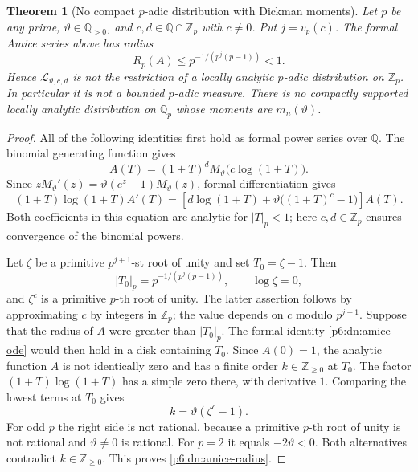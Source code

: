 \documentclass[11pt,a4paper]{article}
\newtheorem{theorem}{Theorem}[section]
\theoremstyle{definition}
\theoremstyle{remark}
\numberwithin{equation}{section}
\begin{document}
\begin{theorem}[No compact $p$-adic distribution with Dickman moments]
\label{p6:dn:no-transfer}
Let $p$ be any prime, $\vartheta\in\mathbb Q_{>0}$,
and $c,d\in\mathbb Q\cap\mathbb Z_p$ with $c\ne0$.
Put $j=v_p(c)$.  The formal Amice series above has radius
\begin{equation}\label{p6:dn:amice-radius}
 R_p(A)\le p^{-1/(p^j(p-1))}<1.
\end{equation}
Hence $\mathcal L_{\vartheta,c,d}$ is not the restriction of a
locally analytic $p$-adic distribution on $\mathbb Z_p$.
In particular it is not a bounded $p$-adic measure.
There is no compactly supported locally analytic distribution on
$\mathbb Q_p$ whose moments are $m_n(\vartheta)$.
\end{theorem}
\begin{proof}
All of the following identities first hold as formal power series
over $\mathbb Q$.  The binomial generating function gives
\[
 A(T)=(1+T)^dM_\vartheta\bigl(c\log(1+T)\bigr).
\]
Since $zM_\vartheta'(z)=\vartheta(e^z-1)M_\vartheta(z)$,
formal differentiation gives
\begin{equation}\label{p6:dn:amice-ode}
 (1+T)\log(1+T)A'(T)=
 \left[d\log(1+T)+\vartheta\bigl((1+T)^c-1\bigr)\right]A(T).
\end{equation}
Both coefficients in this equation are analytic for $|T|_p<1$;
here $c,d\in\mathbb Z_p$ ensures convergence of the binomial powers.

Let $\zeta$ be a primitive $p^{j+1}$-st root of unity and set
$T_0=\zeta-1$.  Then
\[
 |T_0|_p=p^{-1/(p^j(p-1))},\qquad
 \log\zeta=0,
\]
and $\zeta^c$ is a primitive $p$-th root of unity.  The latter
assertion follows by approximating $c$ by integers in $\mathbb Z_p$;
the value depends on $c$ modulo $p^{j+1}$.
Suppose that the radius of $A$ were greater than $|T_0|_p$.
The formal identity \eqref{p6:dn:amice-ode} would then hold in a disk
containing $T_0$.  Since $A(0)=1$, the analytic function $A$ is
not identically zero and has a finite order $k\in\mathbb Z_{\ge0}$
at $T_0$.  The factor $(1+T)\log(1+T)$ has a simple zero there,
with derivative $1$.  Comparing the lowest terms at $T_0$ gives
\begin{equation}\label{p6:dn:resonance}
 k=\vartheta(\zeta^c-1).
\end{equation}
For odd $p$ the right side is not rational, because a primitive
$p$-th root of unity is not rational and $\vartheta\ne0$ is rational.
For $p=2$ it equals $-2\vartheta<0$.
Both alternatives contradict $k\in\mathbb Z_{\ge0}$.
This proves \eqref{p6:dn:amice-radius}.


\end{proof}
\end{document}
